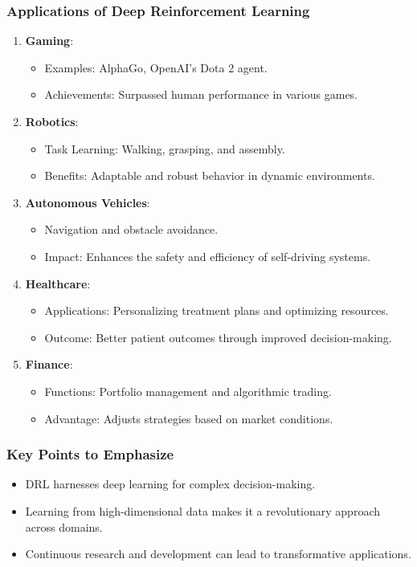 \documentclass[aspectratio=169]{beamer}
\begin{document}
\begin{frame}[fragile]
    \frametitle{Applications of Deep Reinforcement Learning}
    \begin{enumerate}
        \item \textbf{Gaming}:
            \begin{itemize}
                \item Examples: AlphaGo, OpenAI's Dota 2 agent.
                \item Achievements: Surpassed human performance in various games.
            \end{itemize}
        \item \textbf{Robotics}:
            \begin{itemize}
                \item Task Learning: Walking, grasping, and assembly.
                \item Benefits: Adaptable and robust behavior in dynamic environments.
            \end{itemize}
        \item \textbf{Autonomous Vehicles}:
            \begin{itemize}
                \item Navigation and obstacle avoidance.
                \item Impact: Enhances the safety and efficiency of self-driving systems.
            \end{itemize}
        \item \textbf{Healthcare}:
            \begin{itemize}
                \item Applications: Personalizing treatment plans and optimizing resources.
                \item Outcome: Better patient outcomes through improved decision-making.
            \end{itemize}
        \item \textbf{Finance}:
            \begin{itemize}
                \item Functions: Portfolio management and algorithmic trading.
                \item Advantage: Adjusts strategies based on market conditions.
            \end{itemize}
    \end{enumerate}
\end{frame}

\begin{frame}[fragile]
    \frametitle{Key Points to Emphasize}
    \begin{itemize}
        \item DRL harnesses deep learning for complex decision-making.
        \item Learning from high-dimensional data makes it a revolutionary approach across domains.
        \item Continuous research and development can lead to transformative applications.
    \end{itemize}
\end{frame}
\end{document}
